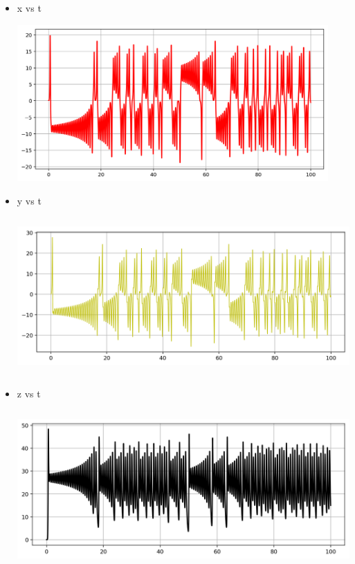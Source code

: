 \documentclass{article}
\begin{document}
\begin{itemize}
\item x vs t

\begin{center}
\includegraphics[height=6cm]{x_t.png}
\end{center}

\item y vs t

\begin{center}
\includegraphics[height=6cm]{y_t.png}
\end{center}

\item z vs t

\begin{center}
\includegraphics[height=6cm]{z_t.png}
\end{center}


\end{itemize}
\end{document}
